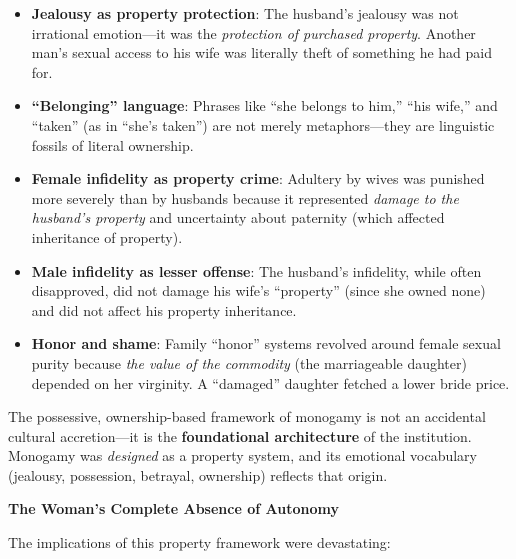 \documentclass[12pt, letterpaper]{article}
\begin{document}
\begin{itemize}
    \item \textbf{Jealousy as property protection}: The husband's jealousy was not irrational emotion---it was the \textit{protection of purchased property}. Another man's sexual access to his wife was literally theft of something he had paid for.
    
    \item \textbf{``Belonging'' language}: Phrases like ``she belongs to him,'' ``his wife,'' and ``taken'' (as in ``she's taken'') are not merely metaphors---they are linguistic fossils of literal ownership.
    
    \item \textbf{Female infidelity as property crime}: Adultery by wives was punished more severely than by husbands because it represented \textit{damage to the husband's property} and uncertainty about paternity (which affected inheritance of property).
    
    \item \textbf{Male infidelity as lesser offense}: The husband's infidelity, while often disapproved, did not damage his wife's ``property'' (since she owned none) and did not affect his property inheritance.
    
    \item \textbf{Honor and shame}: Family ``honor'' systems revolved around female sexual purity because \textit{the value of the commodity} (the marriageable daughter) depended on her virginity. A ``damaged'' daughter fetched a lower bride price.
\end{itemize}

The possessive, ownership-based framework of monogamy is not an accidental cultural accretion---it is the \textbf{foundational architecture} of the institution. Monogamy was \textit{designed} as a property system, and its emotional vocabulary (jealousy, possession, betrayal, ownership) reflects that origin.

\textbf{The Woman's Complete Absence of Autonomy}

The implications of this property framework were devastating:
\end{document}
